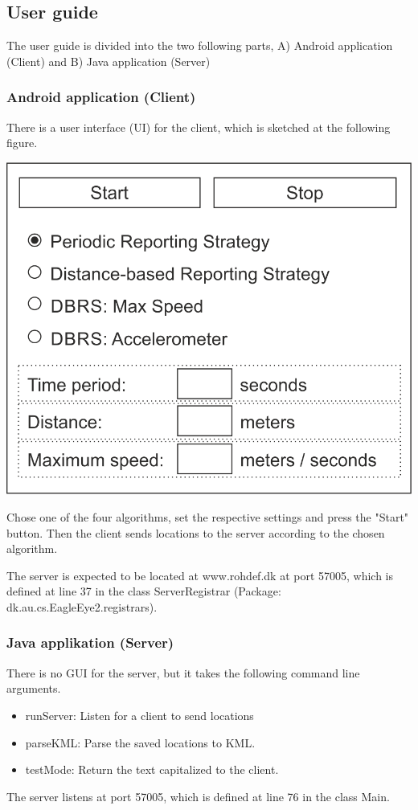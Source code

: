 \subsection{User guide}
The user guide is divided into the two following parts, A) Android application (Client) and B) Java application (Server)

\subsubsection*{Android application (Client)}
There is a user interface (UI) for the client, which is sketched at the following figure.

\includegraphics{GUI}

Chose one of the four algorithms, set the respective settings and press the "Start" button. Then the client sends locations to the server according to the chosen algorithm.

The server is expected to be located at www.rohdef.dk at port 57005, which is defined at line 37 in the class ServerRegistrar (Package: dk.au.cs.EagleEye2.registrars).

\subsubsection*{Java applikation (Server)}
There is no GUI for the server, but it takes the following command line arguments.

\begin{itemize} \itemsep1pt \parskip0pt 
  \item runServer: Listen for a client to send locations
  \item parseKML: Parse the saved locations to KML.
  \item testMode: Return the text capitalized to the client.
\end{itemize}

The server listens at port 57005, which is defined at line 76 in the class Main.